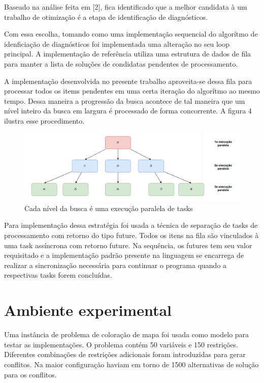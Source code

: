 \documentclass[conference]{IEEEtran}
\begin{document}
Baseado na análise feita em [2], fica identificado que a melhor candidata à um trabalho de otimização é a etapa de identificação de diagnósticos.

Com essa escolha, tomando como uma implementação sequencial do algorítmo de idenficiação de diagnósticos foi implementada uma alteração no seu loop principal. A implementação de referência utiliza uma estrutura de dados de fila para manter a lista de soluções de condidatas pendentes de processamento. 

A implementação desenvolvida no presente trabalho aproveita-se  dessa fila para processar todos os items pendentes em uma certa iteração do algorítmo ao mesmo tempo. Dessa maneira a progressão da busca acontece de tal maneira que um nível inteiro da busca em largura é processado de forma concorrente. A figura 4 ilustra esse procedimento.

\begin{figure}[htbp]
\centerline{\includegraphics[width=0.7\columnwidth]{runtime.png}}
\caption{Cada nível da busca é uma execução paralela de tasks} 
\label{fig}
\end{figure}

Para implementação dessa estratégia foi usada a técnica de separação de tasks de processamento com retorno do tipo future. Todos os itens na fila são vinculados à uma task assíncrona com retorno future. Na sequência, os futures tem seu valor requisitado e a implementação padrão presente na linguagem se encarrega de realizar a sincronização necessária para continuar o programa quando a respectivas tasks forem concluídas. 

\section{Ambiente experimental}

Uma instância de problema de coloração de mapa foi usada como modelo para testar as implementações. O problema contém 50 variáveis e 150 restrições. Diferentes combinações de restrições adicionais foram introduzidas para gerar conflitos. Na maior configuração haviam em torno de 1500 alternativas de solução para os conflitos. 
\end{document}
